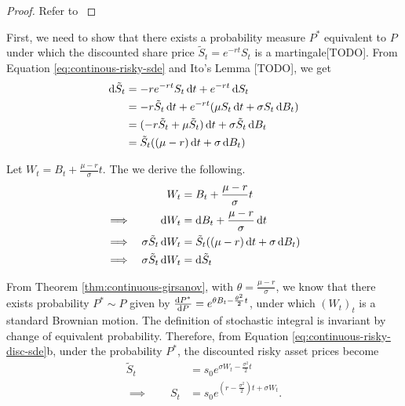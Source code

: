 \begin{proof}
	Refer to \cite[Theorem 4.2.2 and Chapter 4: Exercise 19]{Lamberton1996}
\end{proof}


First, we need to show that there exists a probability measure $ P^* $ equivalent to $ P $ under which the discounted share price $ \tilde{S}_t = e^{-rt} S_t $ is a martingale[TODO]. From Equation \ref{eq:continous-risky-sde} and Ito's Lemma [TODO], we get
\begin{align*}
	\dif \tilde{S}_t  &=  -r e^{-rt} S_t \dif t + e^{-rt} \dif S_t  \\
	&=  -r \tilde{S}_t \dif t + e^{-rt} ( \mu S_t \dif t + \sigma S_t \dif B_t )  \\
	&=  (-r \tilde{S}_t + \mu \tilde{S}_t) \dif t + \sigma \tilde{S}_t \dif B_t  \\
	&=  \tilde{S}_t ( (\mu - r) \dif t + \sigma \dif B_t )
\end{align*}

Let $ W_t = B_t + \frac{\mu - r}{\sigma} t $. The we derive the following.
\begin{subequations}
	\label{eq:continuous-risky-disc-sde}
	\begin{align}
		&&  W_t  &=  B_t + \frac{\mu - r}{\sigma} t  \\
		\implies  &&  \dif W_t  &=  \dif B_t + \frac{\mu - r}{\sigma} \dif t  \nonumber \\
		\implies  &&  \sigma \tilde{S}_t \dif W_t  &=  \tilde{S}_t ( (\mu - r) \dif t + \sigma \dif B_t )  \nonumber \\
		\implies  &&  \sigma \tilde{S}_t \dif W_t  &=  \dif \tilde{S}_t
	\end{align}
\end{subequations}

From Theorem \ref{thm:continuous-girsanov}, with $ \theta = \frac{\mu - r}{\sigma} $, we know that there exists probability $ P^* \sim P $ given by $ \frac{\dif P^*}{\dif P} = e^{ \theta B_t - \frac{\theta^2}{2} t } $,
under which $ (W_t)_t $ is a standard Brownian motion. The definition of stochastic integral is invariant by change of equivalent probability. Therefore, from Equation \ref{eq:continuous-risky-disc-sde}b, under the probability $ P^* $, the discounted risky asset prices become
\begin{subequations}
	\begin{align}
		\label{eq:continous-risky}
		\tilde{S}_t  &=  s_0 e^{\sigma W_t - \frac{\sigma^2}{2} t }  \\
		\implies  \qquad  S_t  &=  s_0 e^{ ( r - \frac{\sigma^2}{2} ) t + \sigma W_t }.
	\end{align}	
\end{subequations}


